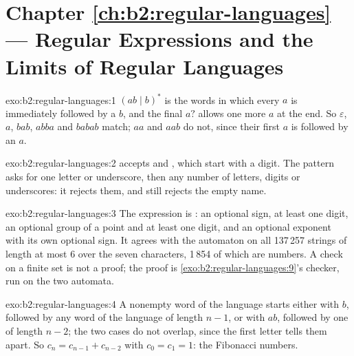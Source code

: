 \section*{Chapter \ref{ch:b2:regular-languages} --- Regular Expressions and the Limits of Regular Languages}

\begin{solution}{exo:b2:regular-languages:1}
$(ab \mid b)^*$ is the words in which every $a$ is immediately followed by a $b$, and the final $a?$ allows one more
$a$ at the end. So $\varepsilon$, $a$, $bab$, $abba$ and $babab$ match; $aa$ and $aab$ do not, since their first $a$
is followed by an $a$.
\end{solution}

\begin{solution}{exo:b2:regular-languages:2}
\code{[a-z0-9_]+} accepts  and , which start with a digit. The pattern \code{[a-z_][a-z0-9_]*}
asks for one letter or underscore, then any number of letters, digits or underscores: it rejects them, and still
rejects the empty name.
\end{solution}

\begin{solution}{exo:b2:regular-languages:3}
The expression is : an optional sign, at least one digit, an optional
group of a point and at least one digit, and an optional exponent with its own optional sign. It agrees with the
automaton on all 137\,257 strings of length at most 6 over the seven characters, 1\,854 of which are numbers. A check
on a finite set is not a proof; the proof is \cref{exo:b2:regular-languages:9}'s checker, run on the two automata.
\end{solution}

\begin{solution}{exo:b2:regular-languages:4}
A nonempty word of the language starts either with $b$, followed by any word of the language of length $n - 1$, or
with $ab$, followed by one of length $n - 2$; the two cases do not overlap, since the first letter tells them apart.
So $c_n = c_{n-1} + c_{n-2}$ with $c_0 = c_1 = 1$: the Fibonacci numbers.
\end{solution}

